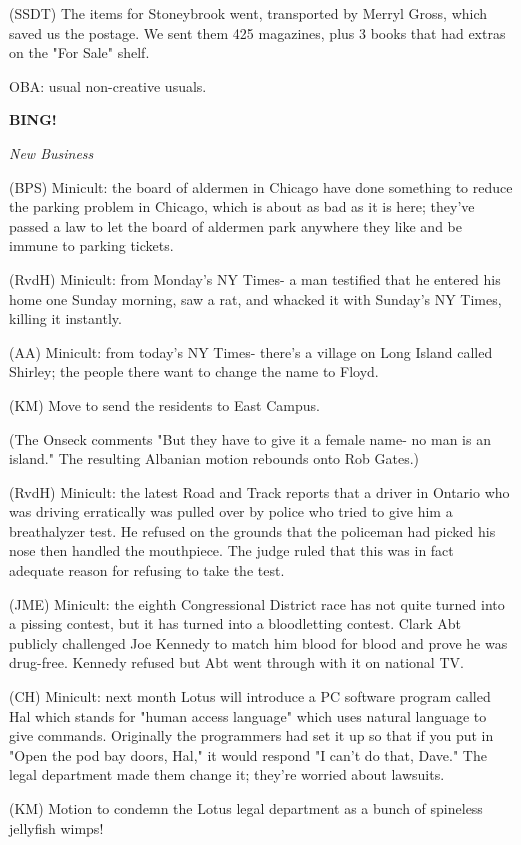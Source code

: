 \documentclass[12pt]{article}
\newcommand{\bing}{{\bf BING!} }
\newcommand{\goto}[1]{\bing \vskip 12pt \centerline{{\em{#1}}}}
\begin{document}
(SSDT) The items for Stoneybrook went, transported by Merryl Gross, which saved us the postage. We sent them 425 magazines, plus 3 books that had extras on the "For Sale" shelf.

OBA: usual non-creative usuals.

\goto{New Business}

(BPS) Minicult: the board of aldermen in Chicago have done something to reduce the parking problem in Chicago, which is about as bad as it is here; they've passed a law to let the board of aldermen park anywhere they like and be immune to parking tickets.

(RvdH) Minicult: from Monday's NY Times- a man testified that he entered his home one Sunday morning, saw a rat, and whacked it with Sunday's NY Times, killing it instantly.

(AA) Minicult: from today's NY Times- there's a village on Long Island called Shirley; the people there want to change the name to Floyd.

(KM) Move to send the residents to East Campus.

(The Onseck comments "But they have to give it a female name- no man is an island." The resulting Albanian motion rebounds onto Rob Gates.)

(RvdH) Minicult: the latest Road and Track reports that a driver in Ontario who was driving erratically was pulled over by police who tried to give him a breathalyzer test. He refused on the grounds that the policeman had picked his nose then handled the mouthpiece. The judge ruled that this was in fact adequate reason for refusing to take the test.

(JME) Minicult: the eighth Congressional District race has not quite turned into a pissing contest, but it has turned into a bloodletting contest. Clark Abt publicly challenged Joe Kennedy to match him blood for blood and prove he was drug-free. Kennedy refused but Abt went through with it on national TV.

(CH) Minicult: next month Lotus will introduce a PC software program called Hal which stands for "human access language" which uses natural language to give commands. Originally the programmers had set it up so that if you put in "Open the pod bay doors, Hal," it would respond "I can't do that, Dave." The legal department made them change it; they're worried about lawsuits.

(KM) Motion to condemn the Lotus legal department as a bunch of spineless jellyfish wimps!
\end{document}
